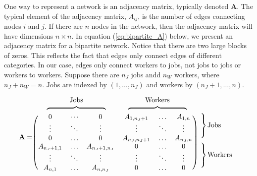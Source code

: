 \documentclass[12pt]{article}
\theoremstyle{definition}
\theoremstyle{plain}
\begin{document}
One way to represent a network is an adjacency matrix, typically denoted $\mathbf{A}$. The typical element of the adjacency matrix, $A_{ij}$, is the number of edges connecting nodes $i$ and $j$. If there are $n$ nodes in the network, then the adjacency matrix will have dimensions $n \times n$. In equation (\ref{eq:bipartite_A}) below, we present an adjacency matrix for a bipartite network. Notice that there are two large blocks of zeros. This reflects the fact that edges only connect edges of different categories. In our case, edges only connect workers to jobs, not jobs to jobs or workers to workers. Suppose there are $n_J$ jobs andd $n_W$ workers, where $n_J+n_W=n$. Jobs are indexed by $(1,\dots,n_J)$ and workers by $(n_J+1,\dots, n)$.

\begin{align*}
\mathbf{A} = 
\begin{blockarray}{ccccccc}
\multicolumn{3}{c}{Jobs} & \multicolumn{3}{c}{Workers} & \\
\multicolumn{3}{c}{$\overbrace{\rule{3cm}{0pt}}$} & \multicolumn{3}{c}{$\overbrace{\rule{3cm}{0pt}}$} & \\
\begin{block}{(cccccc)l}
0 		& \cdots	& 0 		&  A_{1,n_J+1} 	& \dots 	& A_{1,n} 	& \rdelim\} {3}{10pt} \multirow{3}{*}{Jobs } \\
\vdots	& \ddots	& \vdots	& \vdots 		& \ddots 	& \vdots 	& \\
0		& \hdots	& 0	 		& A_{n_J,n_J+1} & \dots 	& A_{n_J,n}	& \\
A_{n_J+1,1} & \hdots	& A_{n_J+1,n_J} & 0 	 	& \dots 	& 0 		&   \rdelim\} {3}{10pt}\multirow{3}{*}{Workers }	\\
\vdots		& \ddots	& \vdots		& \vdots 	& \ddots 	& \vdots	& \\
A_{n,1}		& \hdots	& A_{n,n_J}		& 0 	 	& \dots 	& 0 		& \\
\end{block}
\end{blockarray}
\label{eq:bipartite_A}
\end{align*}
\end{document}
